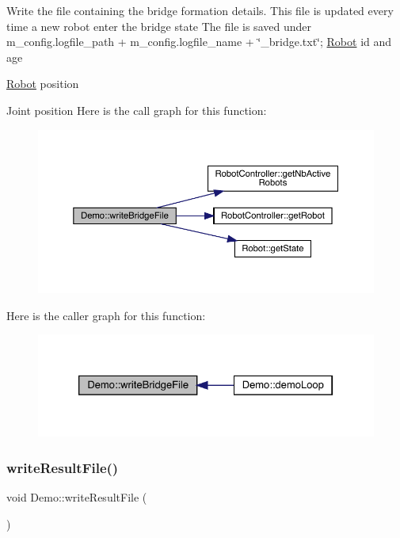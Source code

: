 Write the file containing the bridge formation details. This file is updated every time a new robot enter the bridge state The file is saved under m\+\_\+config.\+logfile\+\_\+path + m\+\_\+config.\+logfile\+\_\+name + \char`\"{}\+\_\+bridge.\+txt\char`\"{}; \mbox{\hyperlink{class_robot}{Robot}} id and age

\mbox{\hyperlink{class_robot}{Robot}} position

Joint position Here is the call graph for this function\+:\nopagebreak
\begin{figure}[H]
\begin{center}
\leavevmode
\includegraphics[width=350pt]{class_demo_a653b6b835b58959fea0758f2a1695002_cgraph}
\end{center}
\end{figure}
Here is the caller graph for this function\+:\nopagebreak
\begin{figure}[H]
\begin{center}
\leavevmode
\includegraphics[width=326pt]{class_demo_a653b6b835b58959fea0758f2a1695002_icgraph}
\end{center}
\end{figure}
\mbox{\label{class_demo_a1b09c62228a007c49ddc0639a65341b2}} 
\subsubsection{\texorpdfstring{write\+Result\+File()}{writeResultFile()}}
{\footnotesize\ttfamily void Demo\+::write\+Result\+File (\begin{DoxyParamCaption}{ }\end{DoxyParamCaption})}

